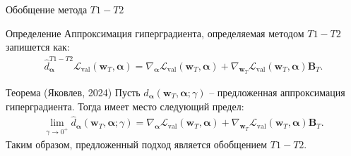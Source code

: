 \documentclass[aspectratio=169]{beamer}
\def\lval{\mathcal{L}_{\mathrm{val}}}
\newcommand{\vect}[1]{\boldsymbol{\mathbf{#1}}}
\begin{document}
\begin{frame}{Обобщение метода $T1-T2$}
  \begin{block}{Определение} Аппроксимация гиперградиента, определяемая методом $T1-T2$ запишется как:
    \begin{align*}
        \hat{d}_{\vect{\alpha}}^{T1-T2}\lval(\vect{w}_T, \vect{\alpha}) = \nabla_{\vect{\alpha}}\lval(\vect{w}_T, \vect{\alpha}) + \nabla_{\vect{w}_T}\lval(\vect{w}_T, \vect{\alpha})\vect{B}_T.
    \end{align*}
    
  \end{block}
  \begin{block}{Теорема (Яковлев, 2024)}
    Пусть $\hat{d}_{\vect{\alpha}}(\vect{w}_T, \vect{\alpha}; \gamma)$ -- предложенная аппроксимация гиперградиента. Тогда имеет место следующий предел:
    \begin{align*}
        \lim_{\gamma \to 0^+}\hat{d}_{\vect{\alpha}}(\vect{w}_T, \vect{\alpha}; \gamma) = \nabla_{\vect{\alpha}}\lval(\vect{w}_T, \vect{\alpha}) + \nabla_{\vect{w}_T}\lval(\vect{w}_T, \vect{\alpha})\vect{B}_T.
    \end{align*}
    Таким образом, предложенный подход является обобщением $T1-T2$.
  \end{block}
  
\end{frame}
\end{document}
